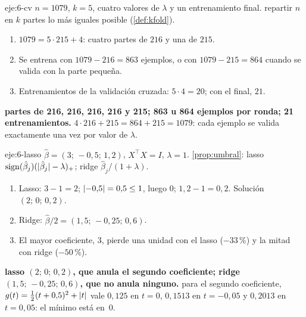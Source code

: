 \begin{solucion}{eje:6-cv}
\datos $n=1079$, $k=5$, cuatro valores de $\lambda$ y un entrenamiento final.
\planteamiento repartir $n$ en $k$ partes lo más iguales posible (\cref{def:kfold}).
\pasos
\begin{enumerate}[label=\arabic*.]
  \item $1079=5\cdot 215+4$: cuatro partes de $216$ y una de $215$.
  \item Se entrena con $1079-216=863$ ejemplos, o con $1079-215=864$ cuando se valida con la parte pequeña.
  \item Entrenamientos de la validación cruzada: $5\cdot 4=20$; con el final, $21$.
\end{enumerate}
\resultado \textbf{partes de 216, 216, 216, 216 y 215; 863 u 864 ejemplos por ronda; 21 entrenamientos.}
\comprobacion $4\cdot 216+215=864+215=1079$: cada ejemplo se valida exactamente una vez por valor de $\lambda$.
\end{solucion}

\begin{solucion}{eje:6-lasso}
\datos $\hat\beta=(3;\,-0{,}5;\,1{,}2)$, $X^{\top}X=I$, $\lambda=1$.
\planteamiento \cref{prop:umbral}: lasso $\operatorname{sign}(\hat\beta_j)(\lvert\hat\beta_j\rvert-\lambda)_{+}$; ridge $\hat\beta_j/(1+\lambda)$.
\pasos
\begin{enumerate}[label=\arabic*.]
  \item Lasso: $3-1=2$; $\lvert-0{,}5\rvert=0{,}5\le 1$, luego $0$; $1{,}2-1=0{,}2$. Solución $(2;\,0;\,0{,}2)$.
  \item Ridge: $\hat\beta/2=(1{,}5;\,-0{,}25;\,0{,}6)$.
  \item El mayor coeficiente, 3, pierde una unidad con el lasso ($-33\,\%$) y la mitad con ridge ($-50\,\%$).
\end{enumerate}
\resultado \textbf{lasso $(2;\,0;\,0{,}2)$, que anula el segundo coeficiente; ridge $(1{,}5;\,-0{,}25;\,0{,}6)$, que no anula ninguno.}
\comprobacion para el segundo coeficiente, $g(t)=\frac12(t+0{,}5)^{2}+\lvert t\rvert$ vale $0{,}125$ en $t=0$, $0{,}1513$ en $t=-0{,}05$ y $0{,}2013$ en $t=0{,}05$: el mínimo está en~0.
\end{solucion}

